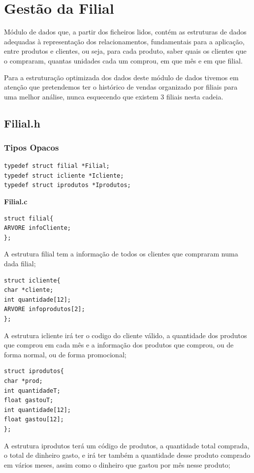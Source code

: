 \section{Gestão da Filial}

Módulo de dados que, a partir dos ficheiros lidos, contém as estruturas de dados adequadas à representação dos relacionamentos, fundamentais para a aplicação, entre produtos e clientes, ou seja, para cada produto, saber quais os clientes que o compraram, quantas unidades cada um comprou, em que mês e em que filial.

 Para a estruturação optimizada dos dados deste módulo de dados tivemos em atenção que pretendemos ter o histórico de vendas organizado por filiais para uma melhor análise, nunca esquecendo que existem 3 filiais nesta cadeia. 

\subsection{Filial.h}

\subsubsection{Tipos Opacos}
\begin{Verbatim}
typedef struct filial *Filial;
typedef struct icliente *Icliente;
typedef struct iprodutos *Iprodutos;
\end{Verbatim}

\textbf{Filial.c}
\begin{verbatim}
struct filial{
ARVORE infoCliente;
};
\end{verbatim}

A estrutura filial tem a informação de todos os clientes que compraram numa dada filial; 

\begin{verbatim}
struct icliente{
char *cliente;
int quantidade[12];
ARVORE infoprodutos[2];
};
\end{verbatim}

A estrutura icliente irá ter o codigo do cliente válido, a quantidade dos produtos que comprou em cada mês e a informação dos produtos que comprou, ou de forma normal, ou de forma promocional; 

\begin{verbatim}
struct iprodutos{
char *prod;
int quantidadeT;
float gastouT;
int quantidade[12];
float gastou[12];
};
\end{verbatim}

A estrutura iprodutos terá um código de produtos, a quantidade total comprada, o total de dinheiro gasto, e irá ter também a quantidade desse produto comprado em vários meses, assim como o dinheiro que gastou por mês nesse produto; 


